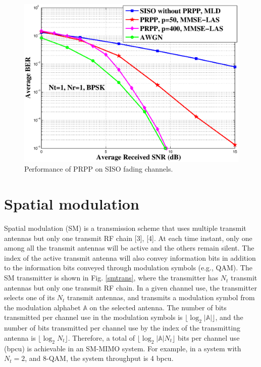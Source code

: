 \documentclass[11pt, onecolumn]{report}
\begin{document}
\begin{figure}[htb]
\centering

\includegraphics[totalheight=9cm,width=12cm]{rameshfig.eps}
\caption{Performance of PRPP on SISO fading channels.}
\label{sisoprecod}
\end{figure}


\section{Spatial modulation}
 Spatial modulation (SM) is a transmission scheme that uses multiple transmit antennas but only one transmit RF chain [3], [4]. At each time instant, only one among all the transmit antennas will be active and the others remain silent. The index of the active transmit antenna will also convey information bits in addition to the information bits conveyed through modulation symbols (e.g., QAM). The SM transmitter is shown in Fig. \ref{smtrans}, where the transmitter has $N_t$ transmit antennas but 
only one transmit RF chain. In a given channel use, 
the transmitter selects one of its $N_t$ transmit antennas, and transmits 
a modulation symbol from the modulation alphabet ${\mathbb A}$ on the selected antenna. 
The number of bits transmitted per channel use in the modulation symbols is 
$\lfloor \log_2|{\mathbb A}| \rfloor$, and the number of bits transmitted 
per channel use by the index of the transmitting antenna is 
$\lfloor \log_2N_t \rfloor$. Therefore, a total of 
$\lfloor \log_2|{\mathbb A}| N_t \rfloor$ bits per channel use (bpcu) is 
achievable in an SM-MIMO system. For example, in a system with $N_t=2$, and
8-QAM, the system throughput is 4 bpcu. 
\end{document}
